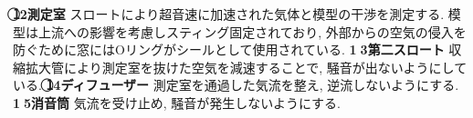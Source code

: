 \documentclass[12pt]{jsarticle}
\begin{document}
{\bf \textcircled{\scriptsize12}測定室} \newline
スロートにより超音速に加速された気体と模型の干渉を測定する. 模型は上流への影響を考慮しスティング固定されており, 外部からの空気の侵入を防ぐために窓にはOリングがシールとして使用されている. \newline\newline
{\bf \textcircled{\scriptsize13}第二スロート} \newline
収縮拡大管により測定室を抜けた空気を減速することで, 騒音が出ないようにしている. \newline\newline
{\bf \textcircled{\scriptsize14}ディフューザー} \newline
測定室を通過した気流を整え, 逆流しないようにする. \newline\newline
{\bf \textcircled{\scriptsize15}消音筒} \newline
気流を受け止め, 騒音が発生しないようにする.
\end{document}
